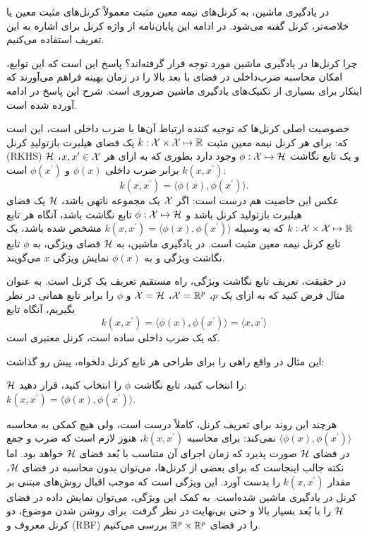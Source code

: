 در یادگیری ماشین، به کرنل‌های نیمه معین مثبت معمولاً کرنل‌های مثبت معین یا خلاصه‌تر، کرنل گفته می‌شود. در ادامه این پایان‌نامه از واژه کرنل برای اشاره به این تعریف استفاده می‌کنیم.

چرا کرنل‌ها در یادگیری ماشین مورد توجه قرار گرفته‌اند؟ پاسخ این است که این توابع، امکان محاسبه ضرب‌داخلی در فضای با بعد بالا را در زمان بهینه فراهم می‌آورند که اینکار برای بسیاری از تکنیک‌های یادگیری ماشین ضروری است. شرح این پاسخ در ادامه آورده شده است.

خصوصیت اصلی کرنل‌ها که توجیه کننده ارتباط آن‌ها با ضرب داخلی است، این است که: برای هر کرنل نیمه معین مثبت $k: \mathcal{X} \times \mathcal{X} \mapsto \mathbb{R}$ یک فضای هیلبرت  بازتولیدِ کرنل 
(RKHS) $\mathcal{H}$ و یک تابع نگاشت $\phi: \mathcal{X} \mapsto \mathcal{H}$ وجود دارد بطوری که
به ازای هر $x,x^\prime \in \mathcal{X}$،
$k(x,x^\prime)$
 برابر ضرب داخلی 
 $\phi(x)$ 
 و $\phi(x^\prime)$ است:
\begin{equation*}
k(x,x^\prime) = \langle\phi(x),\phi(x^\prime)\rangle.
\end{equation*}
عکس این خاصیت هم درست است: اگر $\mathcal{X}$ یک مجموعه ناتهی باشد، $\mathcal{H}$ یک فضای هیلبرت بازتولید کرنل باشد و $\phi: \mathcal{X} \mapsto \mathcal{H}$ تابع نگاشت باشد، آنگاه هر تابع $k: \mathcal{X}\times \mathcal{X} \mapsto \mathbb{R}$ که به وسیله $k(x,x^\prime) = \langle\phi(x),\phi(x^\prime)\rangle$ مشخص شده باشد، یک تابع کرنل نیمه معین مثبت است. در یادگیری ماشین، به $\mathcal{H}$ فضای ویژگی،
به $\phi$ تابع نگاشت ویژگی و
به $\phi(x)$ نمایش ویژگی
$x$ می‌گویند.

در حقیقت، تعریف تابع نگاشت ویژگی، راه مستقیم تعریف یک کرنل است. به عنوان مثال فرض کنید که به ازای یک $p$، 
$\mathcal{X} = \mathbb{R}^p$، $\mathcal{X} = \mathcal{H}$ و $\phi$ را برابر تابع همانی در نظر بگیریم، آنگاه تابع
\begin{equation*}
k(x,x^\prime) = \langle\phi(x),\phi(x^\prime)\rangle = \langle{x,x^\prime}\rangle
\end{equation*}
که یک ضرب داخلی ساده است، کرنل معتبری است.

این مثال در واقع راهی را برای طراحی هر تابع کرنل دلخواه، پیش رو گذاشت:
\begin{enumerate}
 $\mathcal{H}$ را انتخاب کنید،
 تابع نگاشت $\phi$ را انتخاب کنید،
 قرار دهید: $k(x,x^\prime) = \langle\phi(x),\phi(x^\prime)\rangle $.
\end{enumerate}

هرچند این روند برای تعریف کرنل، کاملاً درست است، ولی هیچ کمکی به محاسبه $\langle\phi(x),\phi(x^\prime)\rangle$ نمی‌کند: برای محاسبه $k(x,x^\prime)$، هنوز لازم است که ضرب و جمع در فضای $\mathcal{H}$ صورت پذیرد که زمان اجرای آن متناسب با بُعد فضای $\mathcal{H}$ خواهد بود. اما نکته جالب اینجاست که برای بعضی از کرنل‌ها، می‌توان بدون محاسبه در فضای $\mathcal{H}$، مقدار $k(x,x^\prime)$ را بدست آورد. این ویژگی است که موجب اقبال روش‌های مبتنی بر کرنل در یادگیری ماشین شده‌است. به کمک این ویژگی، می‌توان نمایش داده در فضای $\mathcal{H}$ را با بُعد بسیار بالا و حتی بی‌نهایت در نظر گرفت. برای روشن شدن موضوع، دو کرنل معروف  و (RBF) را در فضای $\mathbb{R}^p\times \mathbb{R}^p$ بررسی می‌کنیم.

